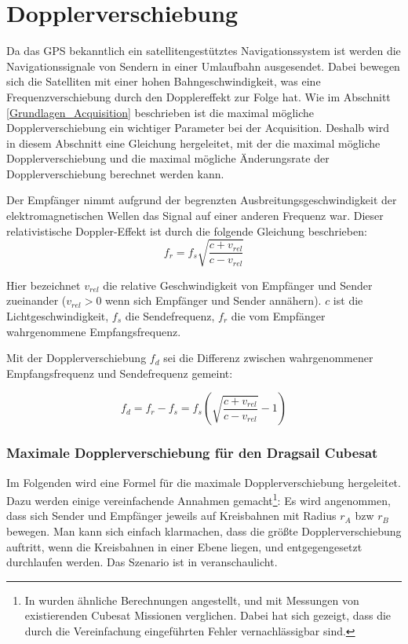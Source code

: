 \section{Dopplerverschiebung}
\label{Dopplereffekt}
Da das GPS bekanntlich ein satellitengestütztes Navigationssystem ist werden die Navigationssignale von Sendern in einer Umlaufbahn ausgesendet. Dabei bewegen sich die Satelliten mit einer hohen Bahngeschwindigkeit, was eine Frequenzverschiebung durch den Dopplereffekt zur Folge hat. Wie im Abschnitt \ref{Grundlagen_Acquisition} beschrieben ist die maximal mögliche Dopplerverschiebung ein wichtiger Parameter bei der Acquisition. Deshalb wird in diesem Abschnitt eine Gleichung hergeleitet, mit der die maximal mögliche Dopplerverschiebung und die maximal mögliche Änderungsrate der Dopplerverschiebung berechnet werden kann.

Der Empfänger nimmt aufgrund der begrenzten Ausbreitungsgeschwindigkeit der elektromagnetischen Wellen das Signal auf einer anderen Frequenz war. Dieser relativistische Doppler-Effekt ist durch die folgende Gleichung beschrieben:
\begin{equation}
    f_r=f_s \sqrt{\frac{c+v_{rel}}{c-v_{rel}}}
\end{equation}

Hier bezeichnet $v_{rel}$ die relative Geschwindigkeit von Empfänger und Sender zueinander ($v_{rel}>0$ wenn sich Empfänger und Sender annähern). $c$ ist die Lichtgeschwindigkeit, $f_s$ die Sendefrequenz, $f_r$ die vom Empfänger wahrgenommene Empfangsfrequenz.

Mit der Dopplerverschiebung $f_d$ sei die Differenz zwischen wahrgenommener Empfangsfrequenz und Sendefrequenz gemeint:

\begin{equation}
\label{EqDoppler}
    f_d=f_r-f_s=f_s \left( \sqrt{\frac{c+v_{rel}}{c-v_{rel}}}-1 \right)
\end{equation}

\subsubsection{Maximale Dopplerverschiebung für den Dragsail Cubesat}\label{maxdopplershift}
Im Folgenden wird eine Formel für die  maximale Dopplerverschiebung hergeleitet. 
Dazu werden einige vereinfachende Annahmen gemacht\footnote{In \cite{Birklykke2010} wurden ähnliche Berechnungen angestellt, und mit Messungen von existierenden Cubesat Missionen verglichen. Dabei hat sich gezeigt, dass die durch die Vereinfachung eingeführten Fehler vernachlässigbar sind.}: Es wird angenommen, dass sich Sender und Empfänger jeweils auf Kreisbahnen mit Radius $r_A$ bzw $r_B$ bewegen. Man kann sich einfach klarmachen, dass die größte Dopplerverschiebung auftritt, wenn die Kreisbahnen in einer Ebene liegen, und entgegengesetzt durchlaufen werden. Das Szenario ist in  veranschaulicht.


